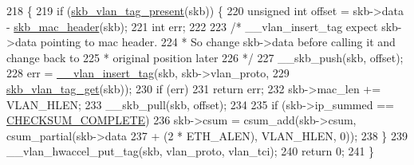 \begin{DoxyCode}
218 \{
219     \textcolor{keywordflow}{if} (\hyperlink{if__vlan_8h_a0bdf3e26944669a4265c7e717e846215}{skb\_vlan\_tag\_present}(skb)) \{
220         \textcolor{keywordtype}{unsigned} \textcolor{keywordtype}{int} offset = skb->data - \hyperlink{skbuff_8h_a292027671dfcf3aa23f9551f48713e24}{skb\_mac\_header}(skb);
221         \textcolor{keywordtype}{int} err;
222 
223         \textcolor{comment}{/* \_\_vlan\_insert\_tag expect skb->data pointing to mac header.}
224 \textcolor{comment}{         * So change skb->data before calling it and change back to}
225 \textcolor{comment}{         * original position later}
226 \textcolor{comment}{         */}
227         \_\_skb\_push(skb, offset);
228         err = \hyperlink{if__vlan_8h_aec003868f531858e684c2ff8edc3ef72}{\_\_vlan\_insert\_tag}(skb, skb->vlan\_proto,
229                     \hyperlink{if__vlan_8h_a0fa23322859cba87d3f5e4526aafd80f}{skb\_vlan\_tag\_get}(skb));
230         \textcolor{keywordflow}{if} (err)
231             \textcolor{keywordflow}{return} err;
232         skb->mac\_len += VLAN\_HLEN;
233         \_\_skb\_pull(skb, offset);
234 
235         \textcolor{keywordflow}{if} (skb->ip\_summed == \hyperlink{skbuff_8h_a207f4c225f70b6bc82d1519bb10245f7}{CHECKSUM\_COMPLETE})
236             skb->csum = csum\_add(skb->csum, csum\_partial(skb->data
237                     + (2 * ETH\_ALEN), VLAN\_HLEN, 0));
238     \}
239     \_\_vlan\_hwaccel\_put\_tag(skb, vlan\_proto, vlan\_tci);
240     \textcolor{keywordflow}{return} 0;
241 \}
\end{DoxyCode}
